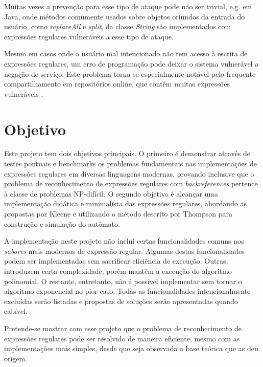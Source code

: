 \documentclass[a4paper,12pt,oneside,onecolumn]{uerj}
\begin{document}
Muitas vezes a prevenção para esse tipo de ataque pode não ser trivial, e.g. em Java, onde métodos comumente usados sobre objetos oriundos da entrada do usuário, como \emph{replaceAll} e \emph{split}, da classe \emph{String} são implementados com expressões regulares vulneráveis a esse tipo de ataque.

Mesmo em casos onde o usuário mal intencionado não tem acesso à escrita de expressões regulares, um erro de programação pode deixar o sistema vulnerável a negação de serviço. Este problema torna-se especialmente notável pelo frequente compartilhamento em repositórios online, que contêm muitas expressões vulneráveis \cite{bib:Kirrage13,bib:Weidman10}. 

\section{Objetivo}

Este projeto tem dois objetivos principais. O primeiro é demonstrar através de testes pontuais e benchmarks os problemas fundamentais nas implementações de expressões regulares em diversas linguagens modernas, provando inclusive que o problema de reconhecimento de expressões regulares com \emph{backreferences} pertence à classe de problemas NP-difícil. O segundo objetivo é alcançar uma implementação didática e minimalista das expressões regulares, abordando as propostas por Kleene e utilizando o método descrito por Thompson para construção e simulação do autômato.

A implementação neste projeto não inclui certas funcionalidades comuns nos \emph{sabores} mais modernos de expressão regular. Algumas destas funcionalidades podem ser implementadas sem sacrificar eficiência de execução. Outras, introduzem certa complexidade, porém mantêm a execução do algoritmo polinomial. O restante, entretanto, não é possível implementar sem tornar o algoritmo exponencial no pior caso. Todas as funcionalidades intencionalmente excluídas serão listadas e propostas de soluções serão apresentadas quando cabível.

Pretende-se mostrar com esse projeto que o problema de reconhecimento de expressões regulares pode ser resolvido de maneira eficiente, mesmo com as implementações mais simples, desde que seja observada a base teórica que as deu origem.

\end{document}
